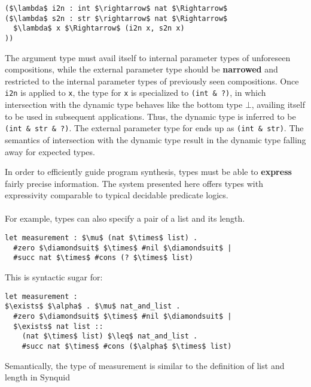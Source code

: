 \documentclass[sigplan,screen]{acmart}
\begin{document}
\begin{lstlisting}
($\lambda$ i2n : int $\rightarrow$ nat $\Rightarrow$ 
($\lambda$ s2n : str $\rightarrow$ nat $\Rightarrow$ 
  $\lambda$ x $\Rightarrow$ (i2n x, s2n x)
))

\end{lstlisting}

The argument type must avail itself to internal parameter types of unforeseen compositions,
while the external parameter type should be \textbf{narrowed} and restricted 
to the internal parameter types of previously seen compositions.
Once \lstinline{i2n} is applied to \lstinline{x}, 
the type for \lstinline{x} is specialized to \lstinline{(int & ?)}, 
in which intersection with the dynamic type behaves like the bottom type $\bot$,
availing itself to be used in subsequent applications. 
Thus, the dynamic type is inferred to be \lstinline{(int & str & ?)}.
The external parameter type for ends up as \lstinline{(int & str)}. 
The semantics of intersection with the dynamic type result in the dynamic type
falling away for expected types.



In order to efficiently guide program synthesis, 
types must be able to \textbf{express} fairly precise information. 
The system presented here offers types with 
expressivity comparable to typical decidable predicate logics. \\
\hfill \\
For example, types can also specify a pair of a list and its length.

\begin{lstlisting}[]
let measurement : $\mu$ (nat $\times$ list) .
  #zero $\diamondsuit$ $\times$ #nil $\diamondsuit$ | 
  #succ nat $\times$ #cons (? $\times$ list)
\end{lstlisting} 

\hfill

\noindent This is syntactic sugar for:

\begin{lstlisting}[]
let measurement : 
$\exists$ $\alpha$ . $\mu$ nat_and_list .
  #zero $\diamondsuit$ $\times$ #nil $\diamondsuit$ | 
  $\exists$ nat list :: 
    (nat $\times$ list) $\leq$ nat_and_list .
    #succ nat $\times$ #cons ($\alpha$ $\times$ list)
\end{lstlisting}

\hfill

\noindent Semantically, the type of measurement is similar to the definition of 
list and length in Synquid \cite{}    
\end{document}
